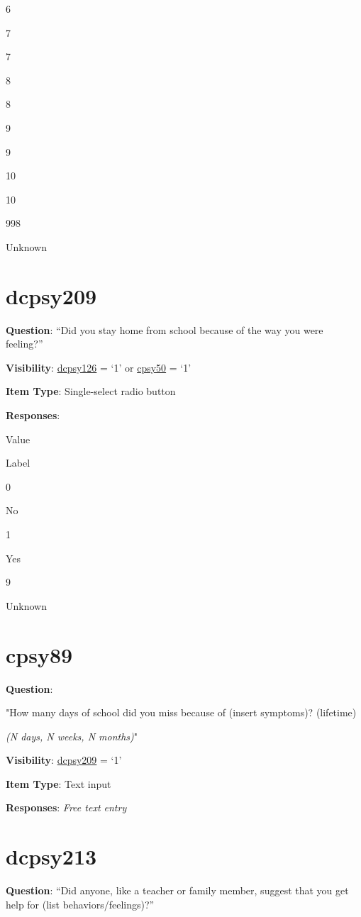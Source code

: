 \documentclass[]{book}
\begin{document}
6

7

7

8

8

9

9

10

10

998

Unknown

\hypertarget{dcpsy209}{%
\section{dcpsy209}\label{dcpsy209}}

\textbf{Question}: ``Did you stay home from school because of the way you were feeling?''

\textbf{Visibility}: \protect\hyperlink{dcpsy126}{dcpsy126} = `1' or \protect\hyperlink{cpsy50}{cpsy50} = `1'

\textbf{Item Type}: Single-select radio button

\textbf{Responses}:

Value

Label

0

No

1

Yes

9

Unknown

\hypertarget{cpsy89}{%
\section{cpsy89}\label{cpsy89}}

\textbf{Question}:

"How many days of school did you miss because of (insert symptoms)? (lifetime)

\emph{(N days, N weeks, N months)}"

\textbf{Visibility}: \protect\hyperlink{dcpsy209}{dcpsy209} = `1'

\textbf{Item Type}: Text input

\textbf{Responses}: \emph{Free text entry}

\hypertarget{dcpsy213}{%
\section{dcpsy213}\label{dcpsy213}}

\textbf{Question}: ``Did anyone, like a teacher or family member, suggest that you get help for (list behaviors/feelings)?''
\end{document}
